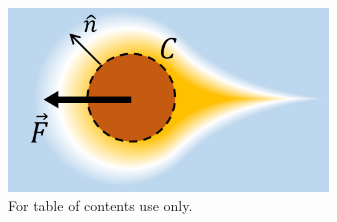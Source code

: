\documentclass[journal=langd5, manuscript=article, layout=twocolumn]{achemso}
\begin{document}
% 

\newpage
\begin{figure}
\centerline{\includegraphics[width=8.5cm]{figures/figtoc}}
\caption{For table of contents use only.}
\end{figure}
\end{document}
